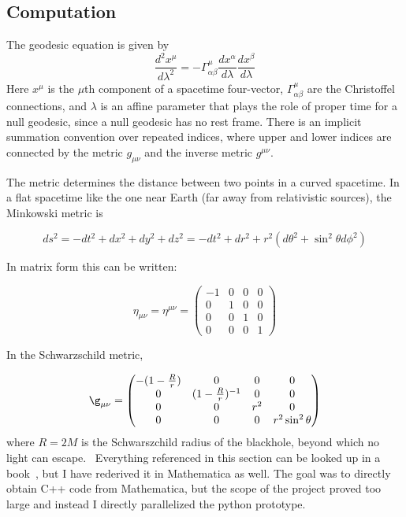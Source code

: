 \documentclass{article}
\begin{document}
\subsection{Computation}

The geodesic equation is given by
\begin{equation}
\frac{d^2x^\mu}{d\lambda^2}=-\Gamma^\mu_{\alpha\beta}\frac{dx^\alpha}{d\lambda}\frac{dx^\beta}{d\lambda}
\label{eqn:geodesic}
\end{equation}
Here $x^\mu$ is the $\mu$th component of a spacetime four-vector, $\Gamma^\mu_{\alpha\beta}$ are the Christoffel connections, and $\lambda$ is an affine parameter that plays the role of proper time for a null geodesic, since a null geodesic has no rest frame. There is an implicit summation convention over repeated indices, where upper and lower indices are connected by the metric $g_{\mu\nu}$ and the inverse metric $g^{\mu\nu}$.~\cite{ref:Carrol} 

The metric determines the distance between two points in a curved
spacetime. In a flat spacetime like the one near Earth (far away from
relativistic sources), the Minkowski metric is

\begin{equation}
ds^2 = -dt^2 + dx^2 + dy^2 + dz^2 = -dt^2 + dr^2 + r^2 (d\theta^2 + \sin^2\theta d\phi^2)
\label{eqn:Minkowski}
\end{equation}

In matrix form this can be written:

\begin{equation}
\eta_{\mu\nu}=\eta^{\mu\nu}=
\begin{pmatrix}
-1 &0 &0 &0\\
0 & 1 &0 &0\\
0 & 0 &1 &0\\
0 & 0 &0 &1
\end{pmatrix}
\label{eqn:eta}
\end{equation}

In the Schwarzschild metric, 

\begin{equation}
\g_{\mu\nu}=
\begin{pmatrix}
-(1-\frac{R}{r}) &0 &0 &0\\
0 &(1-\frac{R}{r})^{-1} &0 &0\\
0 & 0 &r^2 & 0 \\
0 & 0 & 0 & r^2\sin^2\theta
\end{pmatrix}
\label{eqn:gschw}
\end{equation}
where $R=2M$ is the Schwarszchild radius of the blackhole, beyond which no light can escape.~\cite{ref:Carrol} Everything referenced in this section can be looked up in a book~\cite{ref:Carrol}, but I have rederived it in Mathematica as well. The goal was to directly obtain C++ code from Mathematica, but the scope of the project proved too large and instead I directly parallelized the python prototype. 
\end{document}
